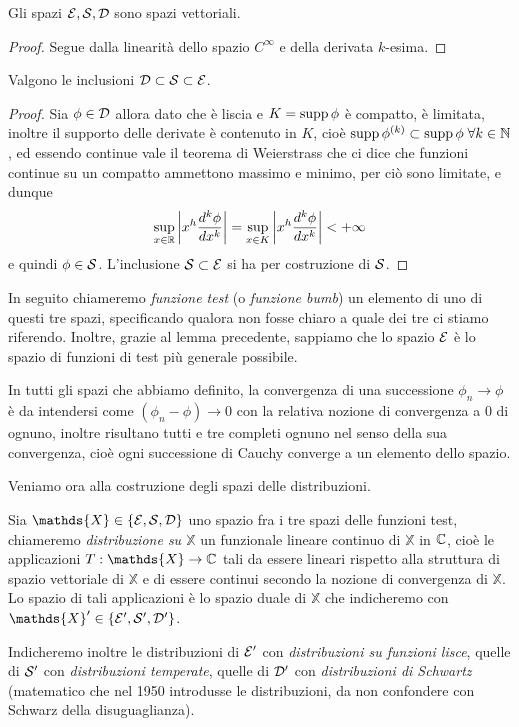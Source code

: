 \begin{lemma}[  ]
  Gli spazi $ \E,\S,\D $ sono spazi vettoriali.
\end{lemma}
\begin{proof}
  Segue dalla linearità dello spazio $ C^\infty $ e della derivata $ k $-esima.
\end{proof}

\begin{lemma}[  ] \label{lem: D in S in E}
  Valgono le inclusioni $ \D \subset \S \subset \E $.
\end{lemma}
\begin{proof}
  Sia $ \phi \in \D $ allora dato che è liscia e $ K = \supp \phi $ è compatto, è limitata, inoltre il supporto delle derivate è contenuto in 
  $ K $, cioè $ \supp \phi^{(k)} \subset \supp \phi \; \forall k \in \mathbb{N} $, ed essendo continue vale il teorema di Weierstrass che ci dice che 
  funzioni continue su un compatto ammettono massimo e minimo, per ciò sono limitate, e dunque
  \begin{align}
    \sup_{x \in \R} \abs{x^h \frac{d^k \phi}{dx^k}} = \sup_{x \in K} \abs{x^h \frac{d^k \phi}{dx^k}} < +\infty
  \end{align}
  e quindi $ \phi \in \S $. L'inclusione $ \S \subset \E $ si ha per costruzione di $\S$.
\end{proof}

In seguito chiameremo \textit{funzione test} (o \textit{funzione bumb}) un elemento di uno di questi tre spazi, specificando qualora non fosse chiaro a 
quale dei tre ci stiamo riferendo. Inoltre, grazie al lemma precedente, sappiamo che lo spazio $ \E $ è lo spazio di funzioni di test più generale 
possibile.

In tutti gli spazi che abbiamo definito, la convergenza di una successione $ \phi_n \to \phi $ è da intendersi come $ (\phi_n - \phi) \to 0 $ con la 
relativa nozione di convergenza a $ 0 $ di ognuno, inoltre risultano tutti e tre completi ognuno nel senso della sua convergenza, cioè ogni successione 
di Cauchy converge a un elemento dello spazio.

Veniamo ora alla costruzione degli spazi delle distribuzioni.

\begin{definition}[ Distribuzioni ]
  Sia $ \mathds{X} \in \{ \E,\S,\D\} $ uno spazio fra i tre spazi delle funzioni test,
  chiameremo \textit{distribuzione su $ \mathds{X} $} un funzionale lineare continuo di 
  $ \mathds{X} $ in $ \C $, cioè le applicazioni $ T:\mathds{X} \to \C $ tali da essere 
  lineari rispetto alla struttura di spazio vettoriale di $ \mathds{X} $ e di essere continui secondo la nozione di convergenza di $ \mathds{X} $. 
  Lo spazio di tali applicazioni è lo spazio duale di $ \mathds{X} $ che indicheremo con $ \mathds{X}' \in \{ \E',\S',\D'\} $.

  Indicheremo inoltre le distribuzioni di $ \E' $ con \textit{distribuzioni su funzioni lisce}, quelle di $ \S' $ con \textit{distribuzioni temperate}, 
  quelle di $ \D' $ con \textit{distribuzioni di Schwartz} (matematico che nel 1950 introdusse le distribuzioni, da non confondere con Schwarz della 
  disuguaglianza).
\end{definition}

